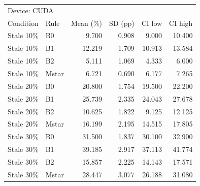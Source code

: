 \begin{tabular}{llrrrr}
\toprule
\multicolumn{6}{l}{Device: CUDA} \\
Condition & Rule & Mean (\%) & SD (pp) & CI low & CI high \\
\midrule
Stale 10\% & B0 & 9.700 & 0.908 & 9.000 & 10.400 \\
Stale 10\% & B1 & 12.219 & 1.709 & 10.913 & 13.584 \\
Stale 10\% & B2 & 5.111 & 1.069 & 4.333 & 6.000 \\
Stale 10\% & Mstar & 6.721 & 0.690 & 6.177 & 7.265 \\
Stale 20\% & B0 & 20.800 & 1.754 & 19.500 & 22.200 \\
Stale 20\% & B1 & 25.739 & 2.335 & 24.043 & 27.678 \\
Stale 20\% & B2 & 10.625 & 1.822 & 9.125 & 12.125 \\
Stale 20\% & Mstar & 16.199 & 2.195 & 14.515 & 17.805 \\
Stale 30\% & B0 & 31.500 & 1.837 & 30.100 & 32.900 \\
Stale 30\% & B1 & 39.185 & 2.917 & 37.113 & 41.774 \\
Stale 30\% & B2 & 15.857 & 2.225 & 14.143 & 17.571 \\
Stale 30\% & Mstar & 28.447 & 3.077 & 26.188 & 31.080 \\
\bottomrule
\end{tabular}
